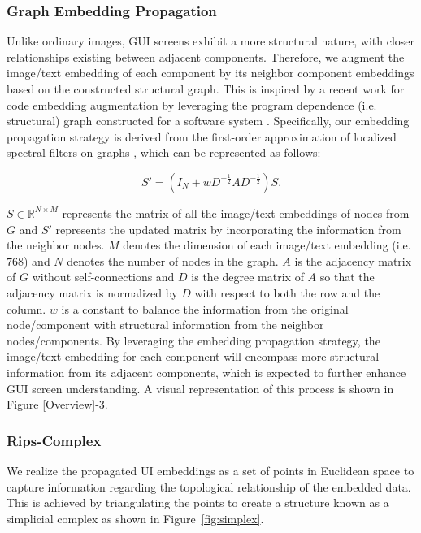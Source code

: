 \subsubsection{Graph Embedding Propagation}
Unlike ordinary images, GUI screens exhibit a more structural nature, with closer relationships existing between adjacent components. Therefore, we augment the image/text embedding of each component by its neighbor component embeddings based on the constructed structural graph. This is inspired by a recent work for code embedding augmentation by leveraging the program dependence (i.e. structural) graph constructed for a software system  \cite{yanfu2024athena}. Specifically, our embedding propagation strategy is derived from the first-order approximation of localized spectral filters on graphs \cite{kipf2016semi, defferrard2016convolutional}, which can be represented as follows: 

\begin{equation} 
    S' = (I_N + w D ^ {-\frac{1}{2}} A  D ^ {-\frac{1}{2}}) S. 
\end{equation} 

$S \in \mathbb{R}^{N \times M}$ represents the matrix of all the image/text embeddings of nodes from $G$ and $S'$ represents the updated matrix by incorporating the information from the neighbor nodes. $M$ denotes the dimension of each image/text embedding (i.e. $768$) and $N$ denotes the number of nodes in the graph. $A$ is the adjacency matrix of $G$ without self-connections and $D$ is the degree matrix of $A$ so that the adjacency matrix is normalized by $D$ with respect to both the row and the column. $w$ is a constant to balance the information from the original node/component with structural information from the neighbor nodes/components. By leveraging the embedding propagation strategy, the image/text embedding for each component will encompass more structural information from its adjacent components, which is expected to further enhance GUI screen understanding. A visual representation of this process is shown in Figure \ref{Overview}-3.  


\subsubsection{Rips-Complex}

We realize the propagated UI embeddings as a set of points in Euclidean space to capture information regarding the topological relationship of the embedded data. This is achieved by triangulating the points to create a structure known as a simplicial complex as shown in Figure~\ref{fig:simplex}. 

